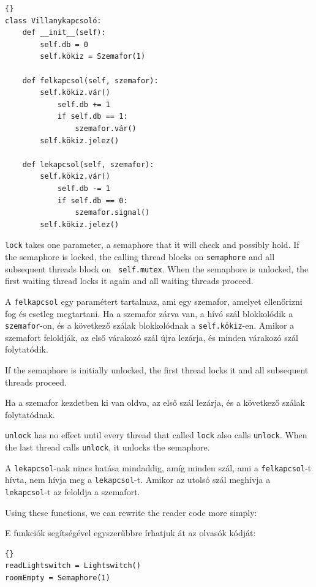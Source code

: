 \documentclass{book}
\begin{document}
\begin{lstlisting}[title={Villanykapcsoló definíció}]{}
class Villanykapcsoló:
    def __init__(self):
        self.db = 0
        self.kökiz = Szemafor(1)

    def felkapcsol(self, szemafor):
        self.kökiz.vár()
            self.db += 1
            if self.db == 1:
                szemafor.vár()
        self.kökiz.jelez()

    def lekapcsol(self, szemafor):
        self.kökiz.vár()
            self.db -= 1
            if self.db == 0:
                szemafor.signal()
        self.kökiz.jelez()
\end{lstlisting}

{\tt lock} takes one parameter, a semaphore that it will check and
possibly hold.  If the semaphore is locked, the calling thread blocks
on {\tt semaphore} and all subsequent threads block on {\tt
self.mutex}.  When the semaphore is unlocked, the first waiting thread
locks it again and all waiting threads proceed.

A {\tt felkapcsol} egy paramétert tartalmaz, ami egy szemafor, amelyet
ellenőrizni fog és esetleg megtartani. Ha a szemafor zárva van,
a hívó szál blokkolódik a {\tt szemafor}-on, és a következő szálak
blokkolódnak a {\tt self.kökiz}-en. Amikor a szemafort feloldják,
az első várakozó szál újra lezárja, és minden várakozó szál
folytatódik.

If the semaphore is initially unlocked, the first thread locks it
and all subsequent threads proceed.

Ha a szemafor kezdetben ki van oldva, az első szál lezárja,
és a következő szálak folytatódnak.

{\tt unlock} has no effect until every thread that called {\tt lock}
also calls {\tt unlock}.  When the last thread calls {\tt unlock}, it
unlocks the semaphore.

A {\tt lekapcsol}-nak nincs hatása mindaddig, amíg minden szál,
ami a {\tt felkapcsol}-t hívta, nem hívja meg a {\tt lekapcsol}-t.
Amikor az utolsó szál meghívja a {\tt lekapcsol}-t
az feloldja a szemafort.

\newpage
Using these functions, we can rewrite the reader code
more simply:

E funkciók segítségével egyszerűbbre írhatjuk át az olvasók kódját:

\begin{lstlisting}[title={Readers-writers initialization}]{}
readLightswitch = Lightswitch()
roomEmpty = Semaphore(1)
\end{lstlisting}
\end{document}
